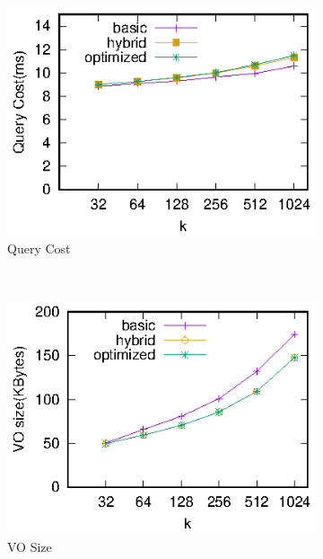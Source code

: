 \begin{figure}[t]
  \centering
  \begin{subfigure}[t]{.33\linewidth}
    \centering
    \includegraphics[width=\linewidth]{exp-figs/knn/querycost.eps}
    \caption{Query Cost}\label{fig:knn:query:query}
  \end{subfigure}~%
  \begin{subfigure}[t]{.33\linewidth}
    \centering
    \includegraphics[width=\linewidth]{exp-figs/knn/vosize.eps}
    \caption{VO Size}\label{fig:knn:query:vo}
  \end{subfigure}~%
  \begin{subfigure}[t]{.33\linewidth}
    \centering

\end{subfigure}
\end{figure}
